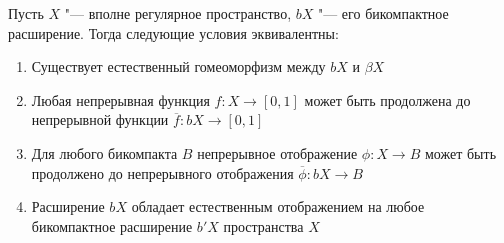 \begin{theorem}\label{stonecech}
    Пусть $X$ "--- вполне регулярное пространство, $bX$ "--- его бикомпактное расширение. Тогда следующие условия эквивалентны:
    \begin{enumerate}
        \item Существует естественный гомеоморфизм между $bX$ и $\beta X$
        
        \item Любая непрерывная функция $f: X \rightarrow [0, 1]$ может быть продолжена до непрерывной функции $\overline{f}: bX \rightarrow [0, 1]$
        
        \item Для любого бикомпакта $B$ непрерывное отображение $\phi: X \to B$ может быть про\-должено до непрерывного отображения $\overline \phi: bX \to B$
        
        \item Расширение $bX$ обладает естественным отображением на любое бикомпактное расширение $b'X$ пространства $X$
    \end{enumerate}
\end{theorem}

